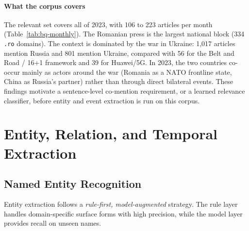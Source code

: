 \documentclass[conference]{IEEEtran}
\begin{document}
\paragraph{What the corpus covers}
The relevant set covers all of 2023, with 106 to 223 articles per month
(Table~\ref{tab:bq-monthly}). The Romanian press is the largest national
block (334 \texttt{.ro} domains). The context is dominated by the war in
Ukraine: 1,017 articles mention Russia and 801 mention Ukraine, compared with
56 for the Belt and Road / 16+1 framework and 39 for Huawei/5G. In 2023, the
two countries co-occur mainly as actors around the war (Romania as a NATO
frontline state, China as Russia's partner) rather than through direct
bilateral events. These findings motivate a sentence-level co-mention
requirement, or a learned relevance classifier, before entity and event
extraction is run on this corpus.

\begin{table}[htbp]
\caption{Relevant Articles per Month, 2023}
\label{tab:bq-monthly}
\centering
\small
\setlength{\tabcolsep}{3pt}
\end{table}

\section{Entity, Relation, and Temporal Extraction}
\label{sec:extraction}

\subsection{Named Entity Recognition}

Entity extraction follows a \emph{rule-first, model-augmented} strategy.
The rule layer handles domain-specific surface forms with high precision,
while the model layer provides recall on unseen names.
\end{document}
